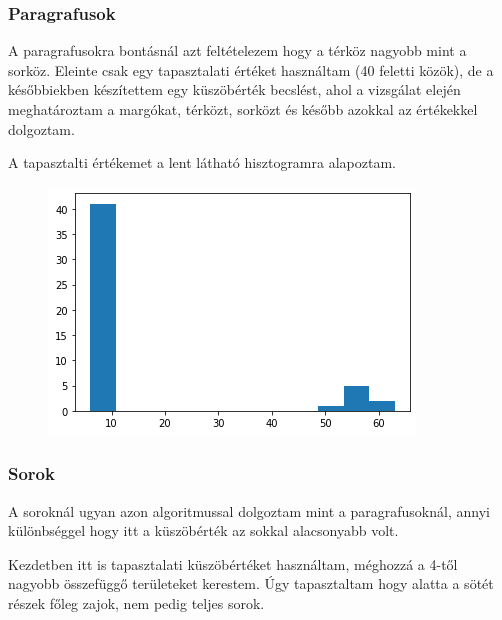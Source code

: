 \documentclass{beamer}
\begin{document}
\begin{frame}[fragile]
\frametitle{Paragrafusok}

A paragrafusokra bontásnál azt feltételezem hogy a térköz nagyobb mint a sorköz.
\newline
Eleinte csak egy tapasztalati értéket használtam (40 feletti közök), de a későbbiekben készítettem egy küszöbérték becslést, ahol a vizsgálat elején meghatároztam a margókat, térközt, sorközt és később azokkal az értékekkel dolgoztam.

\bigskip

A tapasztalti értékemet a lent látható hisztogramra alapoztam.

\begin{figure}[!tbp]
  \centering
  \begin{minipage}[b]{0.45\textwidth}
    \includegraphics[width=\textwidth]{images/segment_hist.png}
  \end{minipage}
\end{figure}

\end{frame}

\begin{frame}[fragile]
\frametitle{Sorok}

A soroknál ugyan azon algoritmussal dolgoztam mint a paragrafusoknál, annyi különbséggel hogy itt a küszöbérték az sokkal alacsonyabb volt.

\bigskip

Kezdetben itt is tapasztalati küszöbértéket használtam, méghozzá a 4-től nagyobb összefüggő területeket kerestem. Úgy tapasztaltam hogy alatta a sötét részek főleg zajok, nem pedig teljes sorok.

\end{frame}
\end{document}
